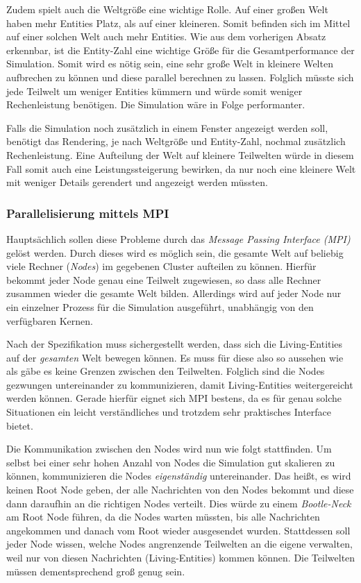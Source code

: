 \documentclass[course=erap]{aspdoc}
\begin{document}
Zudem spielt auch die Weltgröße eine wichtige Rolle. Auf einer großen Welt haben mehr Entities Platz, als auf einer kleineren. Somit befinden sich im Mittel auf einer solchen Welt auch mehr Entities. Wie aus dem vorherigen Absatz erkennbar, ist die Entity-Zahl eine wichtige Größe für die Gesamtperformance der Simulation. Somit wird es nötig sein, eine sehr große Welt in kleinere Welten aufbrechen zu können und diese parallel berechnen zu lassen. Folglich müsste sich jede Teilwelt um weniger Entities kümmern und würde somit weniger Rechenleistung benötigen. Die Simulation wäre in Folge performanter.

Falls die Simulation noch zusätzlich in einem Fenster angezeigt werden soll, benötigt das Rendering, je nach Weltgröße und Entity-Zahl, nochmal zusätzlich Rechenleistung. Eine Aufteilung der Welt auf kleinere Teilwelten würde in diesem Fall somit auch eine Leistungssteigerung bewirken, da nur noch eine kleinere Welt mit weniger Details gerendert und angezeigt werden müssten.


\subsubsection{Parallelisierung mittels MPI}
Hauptsächlich sollen diese Probleme durch das \emph{Message Passing Interface (MPI)} gelöst werden. Durch dieses wird es möglich sein, die gesamte Welt auf beliebig viele Rechner (\emph{Nodes}) im gegebenen Cluster aufteilen zu können. Hierfür bekommt jeder Node genau eine Teilwelt zugewiesen, so dass alle Rechner zusammen wieder die gesamte Welt bilden. Allerdings wird auf jeder Node nur ein einzelner Prozess für die Simulation ausgeführt, unabhängig von den verfügbaren Kernen.

Nach der Spezifikation muss sichergestellt werden, dass sich die Living-Entities auf der \emph{gesamten} Welt bewegen können. Es muss für diese also so aussehen wie als gäbe es keine Grenzen zwischen den Teilwelten. Folglich sind die Nodes gezwungen untereinander zu kommunizieren, damit Living-Entities weitergereicht werden können. Gerade hierfür eignet sich MPI bestens, da es für genau solche Situationen ein leicht verständliches und trotzdem sehr praktisches Interface bietet.

Die Kommunikation zwischen den Nodes wird nun wie folgt stattfinden. Um selbst bei einer sehr hohen Anzahl von Nodes die Simulation gut skalieren zu können, kommunizieren die Nodes \emph{eigenständig} untereinander. Das heißt, es wird keinen Root Node geben, der alle Nachrichten von den Nodes bekommt und diese dann daraufhin an die richtigen Nodes verteilt. Dies würde zu einem \emph{Bootle-Neck} am Root Node führen, da die Nodes warten müssten, bis alle Nachrichten angekommen und danach vom Root wieder ausgesendet wurden. Stattdessen soll jeder Node wissen, welche Nodes angrenzende Teilwelten an die eigene verwalten, weil nur von diesen Nachrichten (Living-Entities) kommen können. Die Teilwelten müssen dementsprechend groß genug sein.
\end{document}
